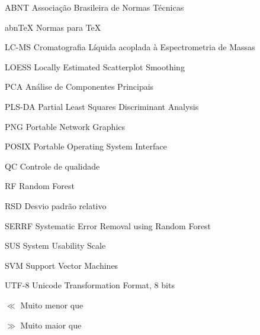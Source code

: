 \documentclass[
	12pt,					%
	openright,				%
	oneside,					%
	a4paper,					%
	english,					%
	portuguese					%
	]{abntex2}
\begin{document}
\begin{siglas}
  \item[ABNT] Associação Brasileira de Normas Técnicas
  \item[abnTeX] Normas para TeX
  \item[LC-MS] Cromatografia Líquida acoplada à Espectrometria de Massas
  \item[LOESS] Locally Estimated Scatterplot Smoothing
  \item[PCA] Análise de Componentes Principais
  \item[PLS-DA] Partial Least Squares Discriminant Analysis
  \item[PNG] Portable Network Graphics
  \item[POSIX] Portable Operating System Interface
  \item[QC] Controle de qualidade
  \item[RF] Random Forest
  \item[RSD] Desvio padrão relativo
  \item[SERRF] Systematic Error Removal using Random Forest
  \item[SUS] System Usability Scale
  \item[SVM] Support Vector Machines
  \item[UTF-8] Unicode Transformation Format, 8 bits
\end{siglas}

\begin{simbolos}
\item[$\ll$] Muito menor que
\item[$\gg$] Muito maior que
\end{simbolos}

\tableofcontents*
\cleardoublepage


\textual %

\cleardoublepage %


\setcounter{page}{16} %
\end{document}
